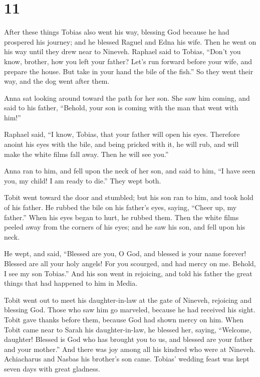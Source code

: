 \hypertarget{section-10}{%
\section{11}\label{section-10}}

 After these things Tobias also went his way, blessing God
because he had prospered his journey; and he blessed Raguel and Edna his
wife. Then he went on his way until they drew near to Nineveh.
 Raphael said to Tobias, ``Don't you know, brother, how
you left your father?  Let's run forward before your wife,
and prepare the house.  But take in your hand the bile of
the fish.'' So they went their way, and the dog went after them.

 Anna sat looking around toward the path for her son.
 She saw him coming, and said to his father, ``Behold,
your son is coming with the man that went with him!''

 Raphael said, ``I know, Tobias, that your father will
open his eyes.  Therefore anoint his eyes with the bile,
and being pricked with it, he will rub, and will make the white films
fall away. Then he will see you.''

 Anna ran to him, and fell upon the neck of her son, and
said to him, ``I have seen you, my child! I am ready to die.'' They wept
both.

 Tobit went toward the door and stumbled; but his son ran
to him,  and took hold of his father. He rubbed the bile
on his father's eyes, saying, ``Cheer up, my father.'' 
When his eyes began to hurt, he rubbed them.  Then the
white films peeled away from the corners of his eyes; and he saw his
son, and fell upon his neck.

 He wept, and said, ``Blessed are you, O God, and blessed
is your name forever! Blessed are all your holy angels! 
For you scourged, and had mercy on me. Behold, I see my son Tobias.''
And his son went in rejoicing, and told his father the great things that
had happened to him in Media.

 Tobit went out to meet his daughter-in-law at the gate
of Nineveh, rejoicing and blessing God. Those who saw him go marveled,
because he had received his sight.  Tobit gave thanks
before them, because God had shown mercy on him. When Tobit came near to
Sarah his daughter-in-law, he blessed her, saying, ``Welcome, daughter!
Blessed is God who has brought you to us, and blessed are your father
and your mother.'' And there was joy among all his kindred who were at
Nineveh.  Achiacharus and Nasbas his brother's son came.
 Tobias' wedding feast was kept seven days with great
gladness.

